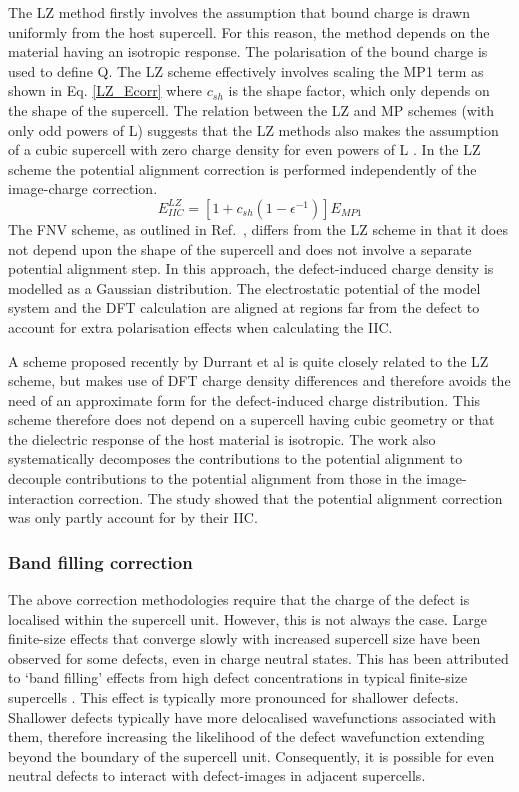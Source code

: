 \documentclass[11pt, twoside]{report}
\begin{document}
The LZ method firstly involves the assumption that bound charge is drawn uniformly from the host supercell. For this reason, the method depends on the material having an isotropic response. The polarisation of the bound charge is used to define Q. The LZ scheme effectively involves scaling the MP1 term as shown in Eq. \ref{LZ_Ecorr} where $c_{sh}$ is the shape factor, which only depends on the shape of the supercell. The relation between the LZ and MP schemes (with only odd powers of L) suggests that the LZ methods also makes the assumption of a cubic supercell with zero charge density for even powers of L \cite{Durrant_defects}. In the LZ scheme the potential alignment correction is performed independently of the image-charge correction.
\begin{equation}\label{LZ_Ecorr}
E_{IIC}^{LZ} = [1 + c_{sh} (1 - \epsilon^{-1}) ] E_{MP1}
\end{equation}
The FNV scheme, as outlined in Ref.~, differs from the LZ scheme in that it does not depend upon the shape of the supercell and does not involve a separate potential alignment step. In this approach, the defect-induced charge density is modelled as a Gaussian distribution. The electrostatic potential of the model system and the DFT calculation are aligned at regions far from the defect to account for extra polarisation effects when calculating the IIC.

A scheme proposed recently by Durrant et al \cite{Durrant_defects} is quite closely related to the LZ scheme, but makes use of DFT charge density differences and therefore avoids the need of an approximate form for the defect-induced charge distribution. This scheme therefore does not depend on a supercell having cubic geometry or that the dielectric response of the host material is isotropic. The work also systematically decomposes the contributions to the potential alignment to decouple contributions to the potential alignment from those in the image-interaction correction. The study showed that the potential alignment correction was only partly account for by their IIC.


\subsubsection{Band filling correction}

The above correction methodologies require that the charge of the defect is localised within the supercell unit. However, this is not always the case. Large finite-size effects that converge slowly with increased supercell size have been observed for some defects, even in charge neutral states. This has been attributed to ‘band filling’ effects from high defect concentrations in typical finite-size supercells \cite{Lany_defects_2008, CIS_defects, pylada}. This effect is typically more pronounced for shallower defects. Shallower defects typically have more delocalised wavefunctions associated with them, therefore increasing the likelihood of the defect wavefunction extending beyond the boundary of the supercell unit. Consequently, it is possible for even neutral defects to interact with defect-images in adjacent supercells. 
\end{document}
